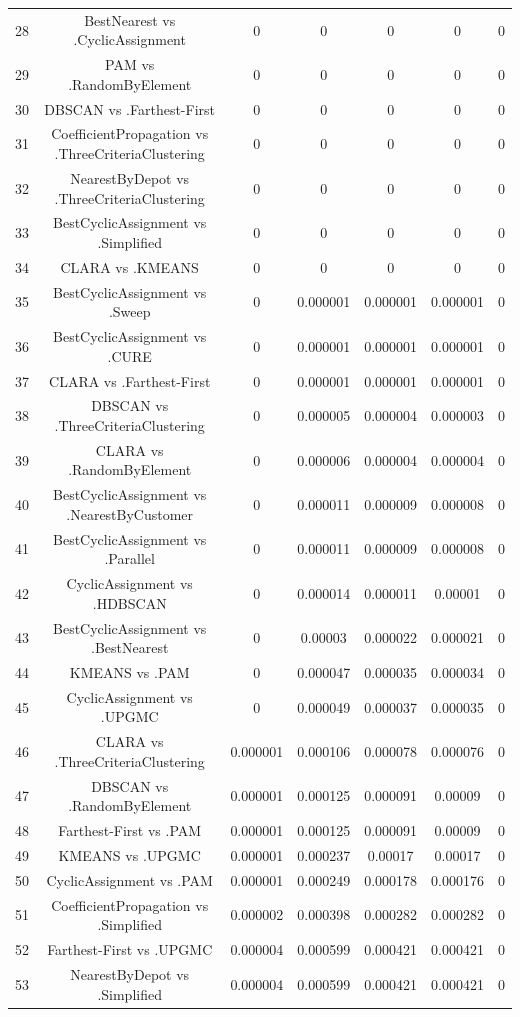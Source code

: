 \documentclass[a4paper,10pt]{article}
\begin{document}
\begin{landscape}
\begin{table}[!htp]
\begin{tabular}{ccccccc}
28&BestNearest vs .CyclicAssignment&0&0&0&0&0\\
29&PAM vs .RandomByElement&0&0&0&0&0\\
30&DBSCAN vs .Farthest-First&0&0&0&0&0\\
31&CoefficientPropagation vs .ThreeCriteriaClustering&0&0&0&0&0\\
32&NearestByDepot vs .ThreeCriteriaClustering&0&0&0&0&0\\
33&BestCyclicAssignment vs .Simplified&0&0&0&0&0\\
34&CLARA vs .KMEANS&0&0&0&0&0\\
35&BestCyclicAssignment vs .Sweep&0&0.000001&0.000001&0.000001&0\\
36&BestCyclicAssignment vs .CURE&0&0.000001&0.000001&0.000001&0\\
37&CLARA vs .Farthest-First&0&0.000001&0.000001&0.000001&0\\
38&DBSCAN vs .ThreeCriteriaClustering&0&0.000005&0.000004&0.000003&0\\
39&CLARA vs .RandomByElement&0&0.000006&0.000004&0.000004&0\\
40&BestCyclicAssignment vs .NearestByCustomer&0&0.000011&0.000009&0.000008&0\\
41&BestCyclicAssignment vs .Parallel&0&0.000011&0.000009&0.000008&0\\
42&CyclicAssignment vs .HDBSCAN&0&0.000014&0.000011&0.00001&0\\
43&BestCyclicAssignment vs .BestNearest&0&0.00003&0.000022&0.000021&0\\
44&KMEANS vs .PAM&0&0.000047&0.000035&0.000034&0\\
45&CyclicAssignment vs .UPGMC&0&0.000049&0.000037&0.000035&0\\
46&CLARA vs .ThreeCriteriaClustering&0.000001&0.000106&0.000078&0.000076&0\\
47&DBSCAN vs .RandomByElement&0.000001&0.000125&0.000091&0.00009&0\\
48&Farthest-First vs .PAM&0.000001&0.000125&0.000091&0.00009&0\\
49&KMEANS vs .UPGMC&0.000001&0.000237&0.00017&0.00017&0\\
50&CyclicAssignment vs .PAM&0.000001&0.000249&0.000178&0.000176&0\\
51&CoefficientPropagation vs .Simplified&0.000002&0.000398&0.000282&0.000282&0\\
52&Farthest-First vs .UPGMC&0.000004&0.000599&0.000421&0.000421&0\\
53&NearestByDepot vs .Simplified&0.000004&0.000599&0.000421&0.000421&0\\

\end{tabular}
\end{table}
\end{landscape}
\end{document}
